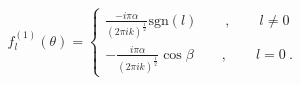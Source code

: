 \begin{equation}
f_{l}^{\left( 1\right) }\left( \theta \right) =\left\{
\begin{array}{c}
\frac{-i\pi \alpha }{\left( 2\pi ik\right) ^{\frac{1}{2}}}\mathrm{sgn}(l) \qquad ,\qquad l \neq 0 \\
-\frac{i\pi \alpha }{\left( 2\pi ik\right) ^{\frac{1}{2}}}\cos\beta \qquad
,\qquad l=0\ .
\end{array}
\right.
\end{equation}

